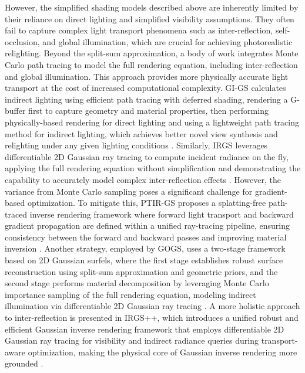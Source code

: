 \documentclass[11pt]{article}
\begin{document}
However, the simplified shading models described above are inherently limited by their reliance on direct lighting and simplified visibility assumptions. They often fail to capture complex light transport phenomena such as inter-reflection, self-occlusion, and global illumination, which are crucial for achieving photorealistic relighting. Beyond the split-sum approximation, a body of work integrates Monte Carlo path tracing to model the full rendering equation, including inter-reflection and global illumination. This approach provides more physically accurate light transport at the cost of increased computational complexity. GI-GS calculates indirect lighting using efficient path tracing with deferred shading, rendering a G-buffer first to capture geometry and material properties, then performing physically-based rendering for direct lighting and using a lightweight path tracing method for indirect lighting, which achieves better novel view synthesis and relighting under any given lighting conditions \cite{ref571}. Similarly, IRGS leverages differentiable 2D Gaussian ray tracing to compute incident radiance on the fly, applying the full rendering equation without simplification and demonstrating the capability to accurately model complex inter-reflection effects \cite{ref572}. However, the variance from Monte Carlo sampling poses a significant challenge for gradient-based optimization. To mitigate this, PTIR-GS proposes a splatting-free path-traced inverse rendering framework where forward light transport and backward gradient propagation are defined within a unified ray-tracing pipeline, ensuring consistency between the forward and backward passes and improving material inversion \cite{ref573}. Another strategy, employed by GOGS, uses a two-stage framework based on 2D Gaussian surfels, where the first stage establishes robust surface reconstruction using split-sum approximation and geometric priors, and the second stage performs material decomposition by leveraging Monte Carlo importance sampling of the full rendering equation, modeling indirect illumination via differentiable 2D Gaussian ray tracing \cite{ref574}. A more holistic approach to inter-reflection is presented in IRGS++, which introduces a unified robust and efficient Gaussian inverse rendering framework that employs differentiable 2D Gaussian ray tracing for visibility and indirect radiance queries during transport-aware optimization, making the physical core of Gaussian inverse rendering more grounded \cite{ref575}.
\end{document}
